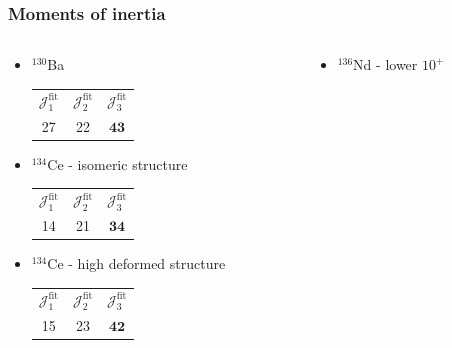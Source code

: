 \documentclass{beamer}
\begin{document}
\begin{frame}
  \frametitle{Moments of inertia}
  \begin{columns}
    \begin{column}{0.5\textwidth}
      \begin{itemize}
      \item $^{130}$Ba
    \begin{table}
      \centering
        \begin{tabular}{|c|c|c|}
          \hline
          $\mathcal{J}_1^\text{fit}$ & $\mathcal{J}_2^\text{fit}$ & $\mathcal{J}_3^\text{fit}$  \\ \cline{1-3}
          27                         & 22                         & $\mathbf{43}$ \\ \hline
        \end{tabular}
      \end{table}
    \item $^{134}$Ce - isomeric structure
    \begin{table}
      \centering
        \begin{tabular}{|c|c|c|}
          \hline
          $\mathcal{J}_1^\text{fit}$ & $\mathcal{J}_2^\text{fit}$ & $\mathcal{J}_3^\text{fit}$  \\ \cline{1-3}
          14                         & 21                         & $\mathbf{34}$ \\ \hline
        \end{tabular}
      \end{table}
    \item $^{134}$Ce - high deformed structure
    \begin{table}
      \centering
        \begin{tabular}{|c|c|c|}
          \hline
          $\mathcal{J}_1^\text{fit}$ & $\mathcal{J}_2^\text{fit}$ & $\mathcal{J}_3^\text{fit}$ \\ \cline{1-3}
          15                         & 23                         & $\mathbf{42}$                                                                                \\ \hline
        \end{tabular}
      \end{table}
    \end{itemize}
    \end{column}
    \begin{column}{0.5\textwidth}
      \begin{itemize}
        \item $^{136}$Nd - lower $10^+$

\end{itemize}
\end{column}
\end{columns}
\end{frame}
\end{document}
